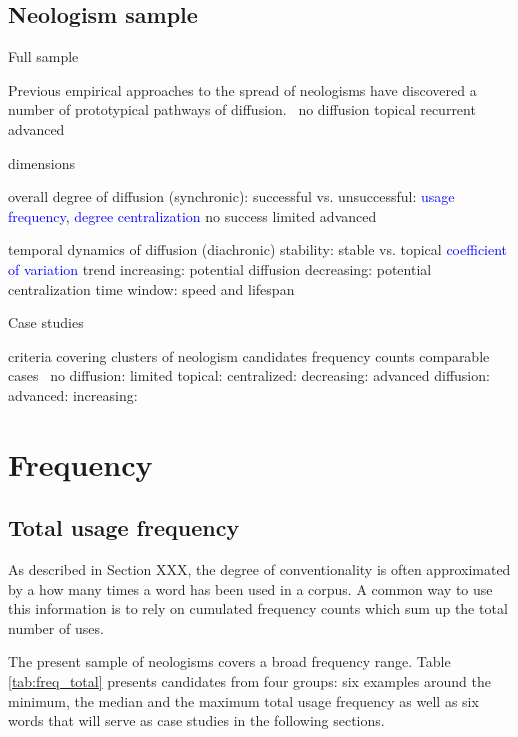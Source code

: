 \documentclass[draft, a4paper, abstract=on]{scrartcl}
\newcommand{\mtrc}[1]{\textcolor{blue}{#1}}
\begin{document}
  \subsection{Neologism sample}

Full sample

Previous empirical approaches to the spread of neologisms have discovered a number of prototypical pathways of diffusion.~\parencite{Kerremans2015WebNew}
no diffusion
topical
recurrent
advanced

dimensions

overall degree of diffusion (synchronic): successful vs. unsuccessful: \mtrc{usage frequency}, \mtrc{degree centralization}
no success
limited
advanced

temporal dynamics of diffusion (diachronic)
stability: stable vs. topical \mtrc{coefficient of variation}
trend
increasing: potential diffusion
decreasing: potential centralization
time window: speed and lifespan

Case studies

criteria
covering clusters of neologism candidates
frequency counts comparable
cases~\parencite{Kerremans2015WebNew}
no diffusion: 
limited
topical: 
centralized: 
decreasing: 
advanced diffusion:
advanced: 
increasing: 

\section{Frequency}

  \subsection{Total usage frequency}

As described in Section XXX, the degree of conventionality is often approximated by a how many times a word has been used in a corpus. A common way to use this information is to rely on cumulated frequency counts which sum up the total number of uses.

The present sample of neologisms covers a broad frequency range. Table \ref{tab:freq_total} presents candidates from four groups: six examples around the minimum, the median and the maximum total usage frequency as well as six words that will serve as case studies in the following sections.
\end{document}

